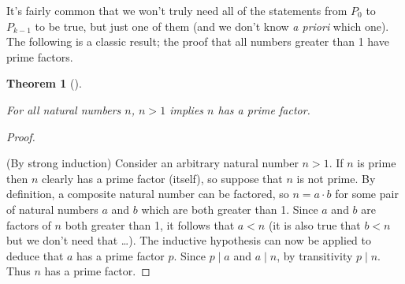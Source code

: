 \documentclass[10pt,]{book}
\theoremstyle{plain}
\newtheorem{theorem}{Theorem}[section]
\theoremstyle{definition}
\theoremstyle{definition}
\numberwithin{equation}{section}
\newcommand{\divides}{\!\mid\!}
\newcommand{\lt}{ < }
\begin{document}
    It's fairly common that we won't truly need all of the statements from \(P_0\)
    to \(P_{k-1}\) to be true, but just one of them (and we don't know \emph{a priori}
    which one). The following is a classic result; the proof that all numbers
    greater than 1 have prime factors.
\begin{theorem}[{}]\label{theorem-26}

        For all natural numbers \(n\), \(n > 1\) implies \(n\) has a prime
        factor.
\end{theorem}
\begin{proof}\hypertarget{proof-37}{}

      (By strong induction)
      Consider an arbitrary natural number \(n>1\). If \(n\) is prime then \(n\) clearly
      has a prime factor (itself), so suppose that \(n\) is not prime. By
      definition, a composite
      natural number can be factored, so \(n=a \cdot b\) for some pair of natural
      numbers \(a\) and \(b\) which are both greater than 1. Since \(a\) and \(b\) are
      factors of \(n\) both greater than 1, it follows that \(a \lt  n\) (it is also
      true that \(b \lt  n\) but we don't need that \dots{}). The inductive hypothesis
      can now be applied to deduce that \(a\) has a prime factor \(p\). Since
      \(p \divides a\) and \(a \divides n\), by transitivity \(p \divides n\). Thus
      \(n\) has a prime factor.
\end{proof}
\typeout{************************************************}
\typeout{************************************************}
\end{document}
